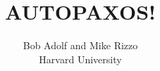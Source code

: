 \documentclass[pageno]{jpaper}
\title{AUTOPAXOS!}
\author{Bob Adolf and Mike Rizzo\\Harvard University}
\date{}
\begin{document}
\maketitle

\begin{abstract}
\lipsum[1]
\end{abstract}










\end{document}
